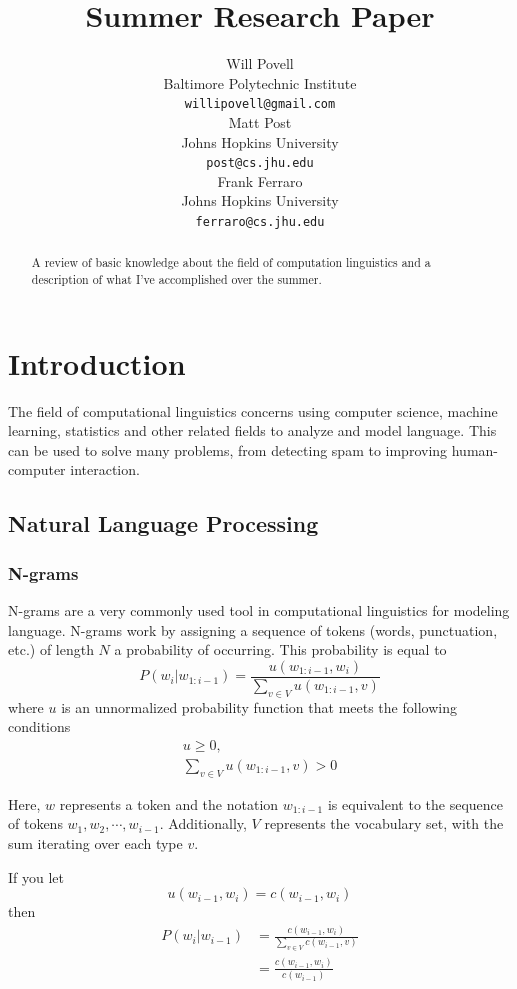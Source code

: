 \documentclass[11pt]{article}
\title{Summer Research Paper}
\author{Will Povell \\
  Baltimore Polytechnic Institute \\
  {\tt willipovell@gmail.com} \\\And
  Matt Post \\
  Johns Hopkins University \\
  {\tt post@cs.jhu.edu} \\\And
  Frank Ferraro \\
  Johns Hopkins University \\
  {\tt ferraro@cs.jhu.edu}}
\date{}
\begin{document}
\maketitle

\begin{abstract}
  A review of basic knowledge about the field of computation linguistics and a description of what I've accomplished over the summer.
\end{abstract}

\section{Introduction}

The field of computational linguistics concerns using computer science, machine learning, statistics and other related fields to analyze and model language. This can be used to solve many problems, from detecting spam to improving human-computer interaction.

\subsection{Natural Language Processing}

\subsubsection{N-grams}

N-grams are a very commonly used tool in computational linguistics for modeling language. N-grams work by assigning a sequence of tokens (words, punctuation, etc.) of length $N$ a probability of occurring. This probability is equal to
$$ P\left(w_i | w_{1:i-1}\right) = \frac{u\left(w_{1:i-1}, w_i\right)}{\sum\limits_{v \in V} u\left(w_{1:i-1}, v\right)} $$
where $u$ is an unnormalized probability function that meets the following conditions
\begin{gather*}
u \geq 0, \\
\sum\limits_{v \in V} u\left(w_{1:i-1}, v\right) > 0
\end{gather*}

Here, $w$ represents a token and the notation $w_{1:i-1}$ is equivalent to the sequence of tokens $w_1, w_2, \cdots, w_{i-1}$. Additionally, $V$ represents the vocabulary set, with the sum iterating over each type $v$.

If you let
$$ u\left(w_{i-1}, w_i\right) = c\left(w_{i-1}, w_i\right) $$
\quad then
\begin{align*}
P\left(w_i \vert w_{i-1} \right) &= \frac{ c\left( w_{i-1}, w_i \right) }{ \sum\limits_{v \in V} c\left( w_{i-1}, v \right)} \\
&= \frac{ c\left( w_{i-1}, w_i \right) }{c\left( w_{i-1} \right) }
\end{align*}
\end{document}

